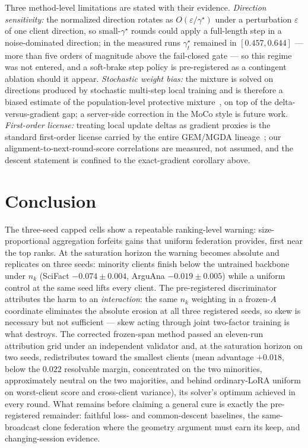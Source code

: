 \documentclass[sigconf,anonymous,review]{acmart}
\begin{document}
Three method-level limitations are stated with their evidence. \emph{Direction sensitivity:} the normalized direction rotates as $O(\varepsilon/\gamma^\star)$ under a perturbation $\varepsilon$ of one client direction, so small-$\gamma^\star$ rounds could apply a full-length step in a noise-dominated direction; in the measured runs $\gamma^\star_t$ remained in $[0.457, 0.644]$ --- more than five orders of magnitude above the fail-closed gate --- so this regime was not entered, and a soft-brake step policy is pre-registered as a contingent ablation should it appear. \emph{Stochastic weight bias:} the mixture is solved on directions produced by stochastic multi-step local training and is therefore a biased estimate of the population-level protective mixture~\cite{fernando2023moco}, on top of the delta-versus-gradient gap; a server-side correction in the MoCo style is future work. \emph{First-order license:} treating local update deltas as gradient proxies is the standard first-order license carried by the entire GEM/MGDA lineage~\cite{lopezpaz2017gem,sener2018mtl}; our alignment-to-next-round-score correlations are measured, not assumed, and the descent statement is confined to the exact-gradient corollary above.

\section{Conclusion}
The three-seed capped cells show a repeatable ranking-level warning: size-proportional aggregation forfeits gains that uniform federation provides, first near the top ranks. At the saturation horizon the warning becomes absolute and replicates on three seeds: minority clients finish below the untrained backbone under $n_k$ (SciFact $-0.074 \pm 0.004$, ArguAna $-0.019 \pm 0.005$) while a uniform control at the same seed lifts every client. The pre-registered discriminator attributes the harm to an \emph{interaction}: the same $n_k$ weighting in a frozen-$A$ coordinate eliminates the absolute erosion at all three registered seeds, so skew is necessary but not sufficient --- skew acting through joint two-factor training is what destroys. The corrected frozen-span method passed an eleven-run attribution grid under an independent validator and, at the saturation horizon on two seeds, redistributes toward the smallest clients (mean advantage $+0.018$, below the $0.022$ resolvable margin, concentrated on the two minorities, approximately neutral on the two majorities, and behind ordinary-LoRA uniform on worst-client score and cross-client variance), its solver's optimum achieved in every round. What remains before claiming a general cure is exactly the pre-registered remainder: faithful loss- and common-descent baselines, the same-broadcast clone federation where the geometry argument must earn its keep, and changing-session evidence.



\end{document}
